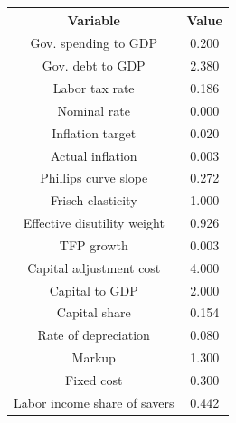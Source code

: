 \begin{table}[!ht]
\setlength\tabcolsep{0.425em}
\setlength\aboverulesep{0pt}
\setlength\belowrulesep{0.2em}
\centering
\begin{threeparttable}
\begin{tabular}{cc}
\toprule[0.1em]
Variable & Value \\[0.2em]
\midrule[0.075em]
Gov. spending to GDP & 0.200 \\[0.2em]
Gov. debt to GDP & 2.380 \\[0.2em]
Labor tax rate & 0.186 \\[0.2em]
Nominal rate & 0.000 \\[0.2em]
Inflation target & 0.020 \\[0.2em]
Actual inflation & 0.003 \\[0.2em]
Phillips curve slope & 0.272 \\[0.2em]
Frisch elasticity & 1.000 \\[0.2em]
Effective disutility weight & 0.926 \\[0.2em]
TFP growth & 0.003 \\[0.2em]
Capital adjustment cost & 4.000 \\[0.2em]
Capital to GDP & 2.000 \\[0.2em]
Capital share & 0.154 \\[0.2em]
Rate of depreciation & 0.080 \\[0.2em]
Markup & 1.300 \\[0.2em]
Fixed cost & 0.300 \\[0.2em]
Labor income share of savers & 0.442 \\[0.2em]
\bottomrule[0.1em]
\end{tabular}
\end{threeparttable}
\end{table}
